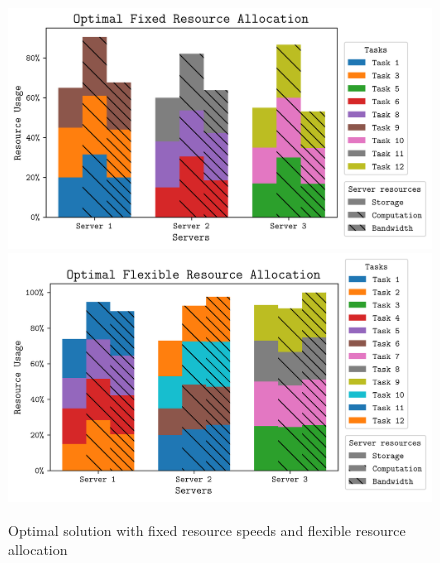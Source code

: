 \begin{figure}
    \centering
    \includegraphics[width=0.48\linewidth]{figs/allocation/optimal_fixed_resource_allocation.png}
    \includegraphics[width=0.48\linewidth]{figs/allocation/optimal_flexible_resource_allocation.png}
    \caption{Optimal solution with fixed resource speeds and flexible resource allocation}
    \label{fig:example-solutions}
\end{figure}
